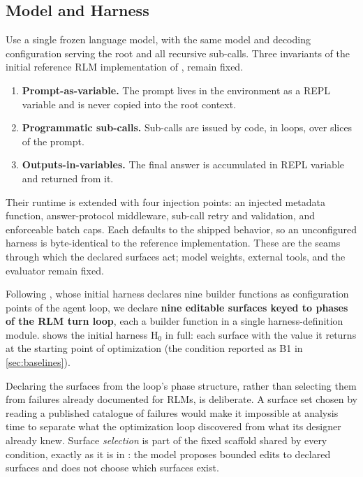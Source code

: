 \documentclass{article}
\newcommand{\rlm}{\textsc{RLM}\xspace}
\newcommand{\rlms}{\textsc{RLM}s\xspace}
\newcommand{\hzero}{\ensuremath{\mathrm{H}_{0}}\xspace}
\begin{document}
\subsection{Model and Harness}
\label{sec:model-and-harness}
Use a single frozen language model, with the same model and decoding configuration serving the root and all recursive sub-calls. Three invariants of the initial reference \rlm{} implementation of \citet{zhang2025rlm}, remain fixed. 
\begin{enumerate}
\item \textbf{Prompt-as-variable.} The prompt lives in the environment as a REPL variable and is never copied into the root context.
\item \textbf{Programmatic sub-calls.} Sub-calls are issued by code, in loops, over slices of the prompt.
\item \textbf{Outputs-in-variables.} The final answer is accumulated in REPL variable and returned from it.
\end{enumerate}
Their runtime is extended with four injection points: an injected metadata function, answer-protocol middleware, sub-call retry and validation, and enforceable batch caps. Each defaults to the shipped behavior, so an unconfigured harness is byte-identical to the reference implementation. These are the seams through which the declared surfaces act; model weights, external tools, and the evaluator remain fixed.

Following \citet{zhang2026selfharness}, whose initial harness declares nine builder functions as configuration points of the agent loop, we declare \textbf{nine editable surfaces keyed to phases of the \rlm{} turn loop}, each a builder function in a single harness-definition module.  shows the initial harness \hzero{} in full: each surface with the value it returns at the starting point of optimization (the condition reported as B1 in \cref{sec:baselines}). 

Declaring the surfaces from the loop's phase structure, rather than selecting them from failures already documented for \rlms{}, is deliberate. A surface set chosen by reading a published catalogue of failures would make it impossible at analysis time to separate what the optimization loop discovered from what its designer already knew. Surface \emph{selection} is part of the fixed scaffold shared by every condition, exactly as it is in \citet{zhang2026selfharness}: the model proposes bounded edits to declared surfaces and does not choose which surfaces exist.
\end{document}
